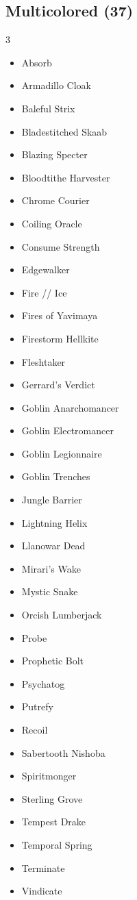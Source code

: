\documentclass[11pt]{article}
\begin{document}
\subsection*{Multicolored (37)}
\begin{multicols}{3}
\footnotesize
\begin{itemize}[leftmargin=1em,itemsep=0pt,parsep=0pt]
\item Absorb
\item Armadillo Cloak
\item Baleful Strix
\item Bladestitched Skaab
\item Blazing Specter
\item Bloodtithe Harvester
\item Chrome Courier
\item Coiling Oracle
\item Consume Strength
\item Edgewalker
\item Fire // Ice
\item Fires of Yavimaya
\item Firestorm Hellkite
\item Fleshtaker
\item Gerrard's Verdict
\item Goblin Anarchomancer
\item Goblin Electromancer
\item Goblin Legionnaire
\item Goblin Trenches
\item Jungle Barrier
\item Lightning Helix
\item Llanowar Dead
\item Mirari's Wake
\item Mystic Snake
\item Orcish Lumberjack
\item Probe
\item Prophetic Bolt
\item Psychatog
\item Putrefy
\item Recoil
\item Sabertooth Nishoba
\item Spiritmonger
\item Sterling Grove
\item Tempest Drake
\item Temporal Spring
\item Terminate
\item Vindicate
\end{itemize}
\end{multicols}
\end{document}
